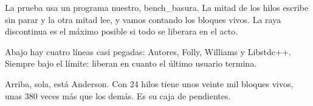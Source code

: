 La prueba usa un programa nuestro, bench\_basura. La mitad de los hilos escribe sin parar y la otra mitad lee, y vamos contando los bloques vivos. La raya discontinua es el máximo posible si todo se liberara en el acto.

Abajo hay cuatro líneas casi pegadas: Autores, Folly, Williams y Libstdc++. Siempre bajo el límite: liberan en cuanto el último usuario termina.

Arriba, sola, está Anderson. Con 24 hilos tiene unos veinte mil bloques vivos, unas 380 veces más que los demás. Es su caja de pendientes.
